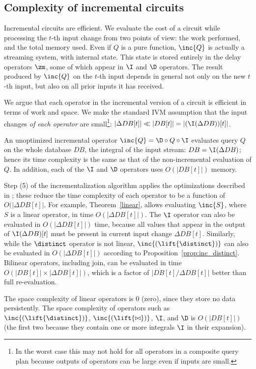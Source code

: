 \subsection{Complexity of incremental circuits}\label{sec:complexity}

Incremental circuits are efficient.  We evaluate the cost of a circuit while processing the
$t$-th input change from two points of view: the work performed, and the total memory used.
Even if $Q$ is a pure function, $\inc{Q}$ is actually a streaming system, with internal state.
This state is stored entirely in the delay operators $\zm$, some of which appear in $\I$ and $\D$ operators.
The result produced by $\inc{Q}$ on the $t$-th input depends in general not only on the new
$t$-th input, but also on all prior inputs it has received.

We argue that each operator in the incremental version of a circuit is efficient in
terms of work and space.  We make the standard IVM assumption that the input changes \emph{of each operator}
are small\footnote{In the worst case this may not hold for all operators in a composite
query plan because outputs of operators can be large even if inputs are small.}: $|\Delta DB[t]| \ll |DB[t]| = |(\I(\Delta DB))[t]|$.

An unoptimized incremental operator $\inc{Q} = \D \circ Q \circ \I$
evaluates query $Q$ on the whole database $DB$, the integral of the input stream:
$DB = \I(\Delta DB)$; hence its time complexity  is the same as that of the non-incremental
evaluation of $Q$.  In addition, each of the $\I$ and $\D$ operators uses $O(|DB[t]|)$ memory.

Step (5) of the incrementalization algorithm applies the optimizations described in ;
these reduce the time complexity of each operator to be a function of $O(|\Delta DB[t]|$.
For example, Theorem~\ref{linear}, allows evaluating $\inc{S}$, where $S$ is a
linear operator, in time $O(|\Delta DB[t]|)$.  The $\I$
operator can also be evaluated in $O(|\Delta DB[t]|)$ time, because
all values that appear in the output of $\I(\Delta DB)[t]$ must be present in
current input change $\Delta DB[t]$.  Similarly, while the $\distinct$ operator is not
linear, $\inc{(\lift{\distinct})}$ can also be evaluated in $O(|\Delta DB[t]|)$ according to
Proposition~\ref{prop:inc_distinct}.  Bilinear operators, including join, can be
evaluated in time $O(|DB[t]| \times |\Delta DB[t]|)$, which is a factor of $|DB[t] / \Delta DB[t]|$
better than full re-evaluation.

The space complexity of linear operators is 0 (zero), since they store no
data persistently.  The space complexity of operators such as $\inc{(\lift{\distinct})}$,
$\inc{(\lift{\bowtie})}$, $\I$, and $\D$ is $O(|DB[t]|)$ (the first two
because they contain one or more integrals $\I$ in their expansion).
